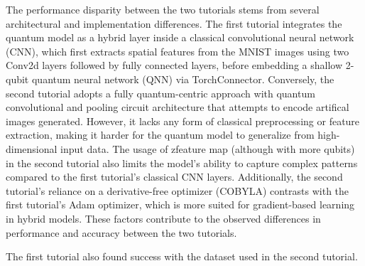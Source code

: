 \documentclass[conference]{IEEEtran}
\begin{document}
The performance disparity between the two tutorials stems from several architectural and implementation differences. The first tutorial integrates the quantum model as a hybrid layer inside a classical convolutional neural network (CNN), which first extracts spatial features from the MNIST images using two Conv2d layers followed by fully connected layers, before embedding a shallow 2-qubit quantum neural network (QNN) via TorchConnector.
Conversely, the second tutorial adopts a fully quantum-centric approach with quantum convolutional and pooling circuit architecture that attempts to encode artifical images generated. However, it lacks any form of classical preprocessing or feature extraction, making it harder for the quantum model to generalize from high-dimensional input data. The usage of zfeature map (although with more qubits) in the second tutorial also limits the model's ability to capture complex patterns compared to the first tutorial's classical CNN layers. Additionally, the second tutorial's reliance on a derivative-free optimizer (COBYLA) contrasts with the first tutorial's Adam optimizer, which is more suited for gradient-based learning in hybrid models. These factors contribute to the observed differences in performance and accuracy between the two tutorials.

The first tutorial also found success with the dataset used in the second tutorial.


\end{document}
